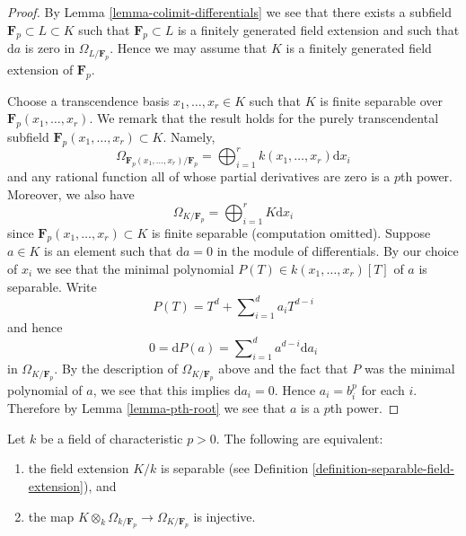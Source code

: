 \begin{proof}
By Lemma \ref{lemma-colimit-differentials} we see that there exists a subfield
$\mathbf{F}_p \subset L \subset K$ such that $\mathbf{F}_p \subset L$
is a finitely generated field extension and such that
$\text{d}a$ is zero in $\Omega_{L/\mathbf{F}_p}$.
Hence we may assume that $K$ is a finitely generated field extension
of $\mathbf{F}_p$.

\medskip\noindent
Choose a transcendence basis $x_1, \ldots, x_r \in K$
such that $K$ is finite separable over $\mathbf{F}_p(x_1, \ldots, x_r)$.
We remark that the result holds for the purely transcendental
subfield $\mathbf{F}_p(x_1, \ldots, x_r) \subset K$.
Namely,
$$
\Omega_{\mathbf{F}_p(x_1, \ldots, x_r)/\mathbf{F}_p} =
\bigoplus\nolimits_{i = 1}^r k(x_1, \ldots, x_r) \text{d}x_i
$$
and any rational function all of whose partial derivatives are zero
is a $p$th power. Moreover, we also have
$$
\Omega_{K/\mathbf{F}_p} =
\bigoplus\nolimits_{i = 1}^r K\text{d}x_i
$$
since $\mathbf{F}_p(x_1, \ldots, x_r) \subset K$ is finite separable
(computation omitted). Suppose $a \in K$ is an element such that
$\text{d}a = 0$ in the module of differentials. By our choice of $x_i$ we
see that the minimal polynomial $P(T) \in k(x_1, \ldots, x_r)[T]$
of $a$ is separable. Write
$$
P(T) = T^d + \sum\nolimits_{i = 1}^d a_i T^{d - i}
$$
and hence
$$
0 = \text{d}P(a) = \sum\nolimits_{i = 1}^d a^{d - i}\text{d}a_i
$$
in $\Omega_{K/\mathbf{F}_p}$. By the description of
$\Omega_{K/\mathbf{F}_p}$ above and the fact that $P$ was the minimal
polynomial of $a$, we see that this implies $\text{d}a_i = 0$.
Hence $a_i = b_i^p$ for each $i$. Therefore by Lemma \ref{lemma-pth-root}
we see that $a$ is a $p$th power.
\end{proof}

\begin{lemma}
\label{lemma-separable-differentials}
Let $k$ be a field of characteristic $p > 0$.
The following are equivalent:
\begin{enumerate}
\item the field extension $K/k$ is separable
(see Definition \ref{definition-separable-field-extension}), and
\item the map
$K \otimes_k \Omega_{k/\mathbf{F}_p} \to \Omega_{K/\mathbf{F}_p}$
is injective.
\end{enumerate}
\end{lemma}

